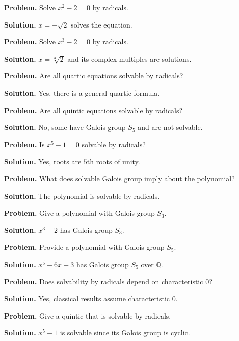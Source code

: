 \begin{example}\label{ex:sec9-1}
\textbf{Problem.} Solve $x^2-2=0$ by radicals.

\textbf{Solution.} $x=\pm\sqrt{2}$ solves the equation.
\end{example}

\begin{example}\label{ex:sec9-2}
\textbf{Problem.} Solve $x^3-2=0$ by radicals.

\textbf{Solution.} $x=\sqrt[3]{2}$ and its complex multiples are solutions.
\end{example}

\begin{example}\label{ex:sec9-3}
\textbf{Problem.} Are all quartic equations solvable by radicals?

\textbf{Solution.} Yes, there is a general quartic formula.
\end{example}

\begin{example}\label{ex:sec9-4}
\textbf{Problem.} Are all quintic equations solvable by radicals?

\textbf{Solution.} No, some have Galois group $S_5$ and are not solvable.
\end{example}

\begin{example}\label{ex:sec9-5}
\textbf{Problem.} Is $x^5-1=0$ solvable by radicals?

\textbf{Solution.} Yes, roots are $5$th roots of unity.
\end{example}

\begin{example}\label{ex:sec9-6}
\textbf{Problem.} What does solvable Galois group imply about the polynomial?

\textbf{Solution.} The polynomial is solvable by radicals.
\end{example}

\begin{example}\label{ex:sec9-7}
\textbf{Problem.} Give a polynomial with Galois group $S_3$.

\textbf{Solution.} $x^3-2$ has Galois group $S_3$.
\end{example}

\begin{example}\label{ex:sec9-8}
\textbf{Problem.} Provide a polynomial with Galois group $S_5$.

\textbf{Solution.} $x^5-6x+3$ has Galois group $S_5$ over $\mathbb{Q}$.
\end{example}

\begin{example}\label{ex:sec9-9}
\textbf{Problem.} Does solvability by radicals depend on characteristic $0$?

\textbf{Solution.} Yes, classical results assume characteristic $0$.
\end{example}

\begin{example}\label{ex:sec9-10}
\textbf{Problem.} Give a quintic that is solvable by radicals.

\textbf{Solution.} $x^5-1$ is solvable since its Galois group is cyclic.
\end{example}
